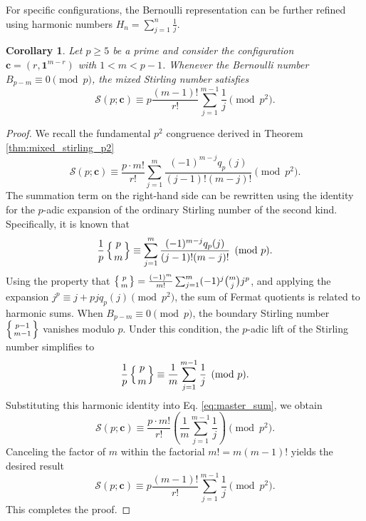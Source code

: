 \documentclass[12pt]{amsart}
\newtheorem{corollary}[theorem]{Corollary}
\theoremstyle{definition}
\begin{document}
For specific configurations, the Bernoulli representation can be further refined using harmonic numbers $H_n = \sum_{j=1}^n \frac{1}{j}$. 
\begin{corollary}%
\label{cor:harmonic_connection}
Let $p \ge 5$ be a prime and consider the configuration $\mathbf{c} = (r, \mathbf{1}^{m-r})$ with $1 < m < p-1$. Whenever the Bernoulli number $B_{p-m} \equiv 0 \pmod p$, the mixed Stirling number satisfies
\begin{equation}
    \mathcal{S}(p; \mathbf{c}) \equiv p \frac{(m-1)!}{r!} \sum_{j=1}^{m-1} \frac{1}{j} \pmod{p^2}.
\end{equation}
\end{corollary}

\begin{proof}
We recall the fundamental $p^2$ congruence derived in Theorem \ref{thm:mixed_stirling_p2}
\begin{equation}
    \label{eq:master_sum}
    \mathcal{S}(p; \mathbf{c}) \equiv \frac{p \cdot m!}{r!} \sum_{j=1}^m \frac{(-1)^{m-j} q_p(j)}{(j-1)!(m-j)!} \pmod{p^2}.
\end{equation}
The summation term on the right-hand side can be rewritten using the identity for the $p$-adic expansion of the ordinary Stirling number of the second kind. Specifically, it is known that
\begin{equation*}
    \frac{1}{p} \left\{ \genfrac{}{}{0pt}{}{p}{m} \right\} \equiv \sum_{j=1}^m \frac{(-1)^{m-j} q_p(j)}{(j-1)!(m-j)!} \pmod p.
\end{equation*}
Using the property that $\left\{ \genfrac{}{}{0pt}{}{p}{m} \right\} = \frac{(-1)^m}{m!} \sum_{j=1}^m (-1)^j \binom{m}{j} j^p$, and applying the expansion $j^p \equiv j + pj q_p(j) \pmod{p^2}$, the sum of Fermat quotients is related to harmonic sums. When $B_{p-m} \equiv 0 \pmod p$, the boundary Stirling number $\left\{ \genfrac{}{}{0pt}{}{p-1}{m-1} \right\}$ vanishes modulo $p$. Under this condition, the $p$-adic lift of the Stirling number simplifies to
\begin{equation*}
    \frac{1}{p} \left\{ \genfrac{}{}{0pt}{}{p}{m} \right\} \equiv \frac{1}{m} \sum_{j=1}^{m-1} \frac{1}{j} \pmod p.
\end{equation*}
Substituting this harmonic identity into Eq. \eqref{eq:master_sum}, we obtain
\begin{equation*}
    \mathcal{S}(p; \mathbf{c}) \equiv \frac{p \cdot m!}{r!} \left( \frac{1}{m} \sum_{j=1}^{m-1} \frac{1}{j} \right) \pmod{p^2}.
\end{equation*}
Canceling the factor of $m$ within the factorial $m! = m(m-1)!$ yields the desired result
\begin{equation*}
    \mathcal{S}(p; \mathbf{c}) \equiv p \frac{(m-1)!}{r!} \sum_{j=1}^{m-1} \frac{1}{j} \pmod{p^2}.
\end{equation*}
This completes the proof.
\end{proof}
\end{document}
